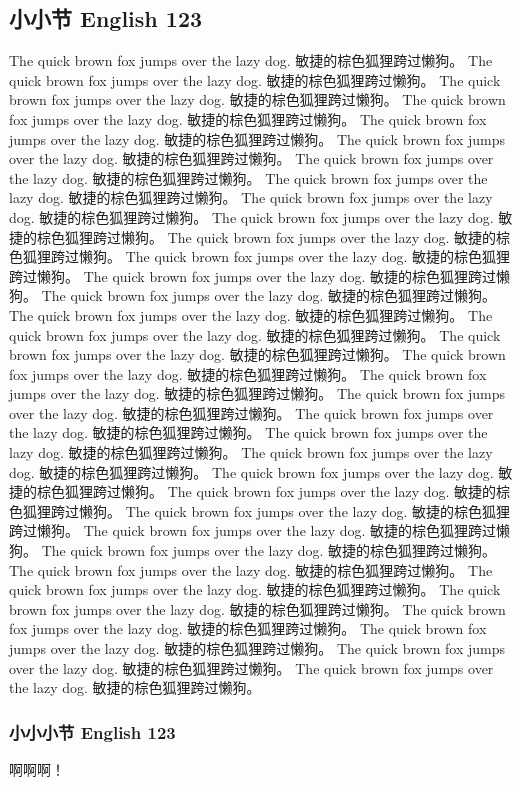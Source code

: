 \subsection{小小节 English 123}
\label{sec:funda:1:1}

The quick brown fox jumps over the lazy dog. 敏捷的棕色狐狸跨过懒狗。
The quick brown fox jumps over the lazy dog. 敏捷的棕色狐狸跨过懒狗。
The quick brown fox jumps over the lazy dog. 敏捷的棕色狐狸跨过懒狗。
The quick brown fox jumps over the lazy dog. 敏捷的棕色狐狸跨过懒狗。
The quick brown fox jumps over the lazy dog. 敏捷的棕色狐狸跨过懒狗。
The quick brown fox jumps over the lazy dog. 敏捷的棕色狐狸跨过懒狗。
The quick brown fox jumps over the lazy dog. 敏捷的棕色狐狸跨过懒狗。
The quick brown fox jumps over the lazy dog. 敏捷的棕色狐狸跨过懒狗。
The quick brown fox jumps over the lazy dog. 敏捷的棕色狐狸跨过懒狗。
The quick brown fox jumps over the lazy dog. 敏捷的棕色狐狸跨过懒狗。
The quick brown fox jumps over the lazy dog. 敏捷的棕色狐狸跨过懒狗。
The quick brown fox jumps over the lazy dog. 敏捷的棕色狐狸跨过懒狗。
The quick brown fox jumps over the lazy dog. 敏捷的棕色狐狸跨过懒狗。
The quick brown fox jumps over the lazy dog. 敏捷的棕色狐狸跨过懒狗。
The quick brown fox jumps over the lazy dog. 敏捷的棕色狐狸跨过懒狗。
The quick brown fox jumps over the lazy dog. 敏捷的棕色狐狸跨过懒狗。
The quick brown fox jumps over the lazy dog. 敏捷的棕色狐狸跨过懒狗。
The quick brown fox jumps over the lazy dog. 敏捷的棕色狐狸跨过懒狗。
The quick brown fox jumps over the lazy dog. 敏捷的棕色狐狸跨过懒狗。
The quick brown fox jumps over the lazy dog. 敏捷的棕色狐狸跨过懒狗。
The quick brown fox jumps over the lazy dog. 敏捷的棕色狐狸跨过懒狗。
The quick brown fox jumps over the lazy dog. 敏捷的棕色狐狸跨过懒狗。
The quick brown fox jumps over the lazy dog. 敏捷的棕色狐狸跨过懒狗。
The quick brown fox jumps over the lazy dog. 敏捷的棕色狐狸跨过懒狗。
The quick brown fox jumps over the lazy dog. 敏捷的棕色狐狸跨过懒狗。
The quick brown fox jumps over the lazy dog. 敏捷的棕色狐狸跨过懒狗。
The quick brown fox jumps over the lazy dog. 敏捷的棕色狐狸跨过懒狗。
The quick brown fox jumps over the lazy dog. 敏捷的棕色狐狸跨过懒狗。
The quick brown fox jumps over the lazy dog. 敏捷的棕色狐狸跨过懒狗。
The quick brown fox jumps over the lazy dog. 敏捷的棕色狐狸跨过懒狗。
The quick brown fox jumps over the lazy dog. 敏捷的棕色狐狸跨过懒狗。
The quick brown fox jumps over the lazy dog. 敏捷的棕色狐狸跨过懒狗。
The quick brown fox jumps over the lazy dog. 敏捷的棕色狐狸跨过懒狗。
The quick brown fox jumps over the lazy dog. 敏捷的棕色狐狸跨过懒狗。
The quick brown fox jumps over the lazy dog. 敏捷的棕色狐狸跨过懒狗。

\subsubsection{小小小节 English 123}
\label{sec:funda:1:1:1}

啊啊啊！